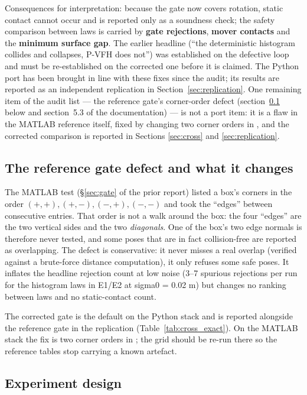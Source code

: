 Consequences for interpretation: because the gate now covers rotation,
static contact cannot occur and is reported only as a soundness check; the
safety comparison between laws is carried by \textbf{gate rejections},
\textbf{mover contacts} and the \textbf{minimum surface gap}. The earlier
headline (``the deterministic histogram collides and collapses, P-VFH does
not'') was established on the defective loop and must be re-established on
the corrected one before it is claimed. The Python port has been brought
in line with these fixes since the audit; its results are reported as an
independent replication in Section~\ref{sec:replication}. One remaining
item of the audit list --- the reference gate's corner-order defect
(section~\ref{sec:audit-gate} below and section~5.3 of the
documentation) --- is not a port item: it is a flaw in the MATLAB reference
itself, fixed by changing two corner orders in ,
and the corrected comparison is reported in Sections \ref{sec:cross} and
\ref{sec:replication}.

\subsection{The reference gate defect and what it changes}
\label{sec:audit-gate}

The MATLAB test (\S\ref{sec:gate} of the prior report) listed a box's
corners in the order $(+,+), (+,-), (-,+), (-,-)$ and took the ``edges''
between consecutive entries. That order is not a walk around the box: the
four ``edges'' are the two vertical sides and the two \emph{diagonals}. One
of the box's two edge normals is therefore never tested, and some poses
that are in fact collision-free are reported as overlapping. The defect is
conservative: it never misses a real overlap (verified against a
brute-force distance computation), it only refuses some safe poses. It
inflates the headline rejection count at low noise (3--7 spurious
rejections per run for the histogram laws in E1/E2 at sigma0 = 0.02 m) but
changes no ranking between laws and no static-contact count.

The corrected gate is the default on the Python stack and is reported
alongside the reference gate in the replication (Table~\ref{tab:cross_exact}).
On the MATLAB stack the fix is two corner orders in
; the grid should be re-run there so the
reference tables stop carrying a known artefact.

\subsection{Experiment design}


